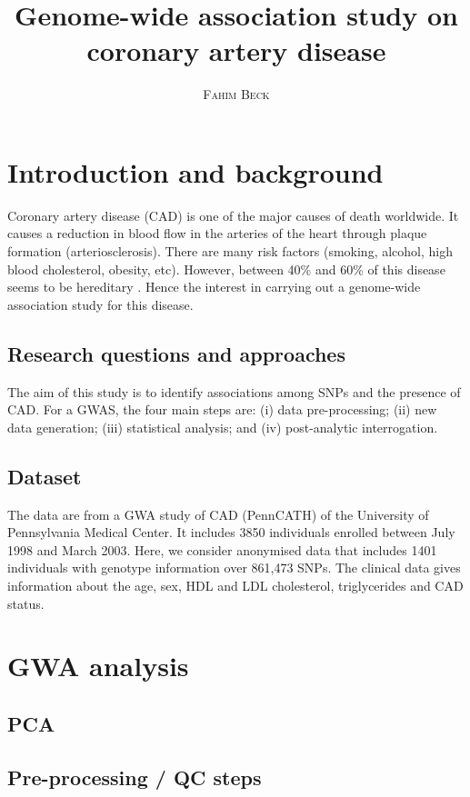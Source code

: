 \documentclass[a4paper, 12pt]{article}
\title{Genome-wide association study on coronary artery disease \vspace{0.3cm}} %
\author{\smallskip
\large \textsc{Fahim Beck}}
\date{\vspace{-1.3cm}}
\begin{document}
\maketitle

\section{Introduction and background}

Coronary artery disease (CAD) is one of the major causes of death worldwide. It causes a reduction in blood flow in the arteries of the heart through plaque formation (arteriosclerosis). There are many risk factors (smoking, alcohol, high blood cholesterol, obesity, etc). However, between 40\% and 60\% of this disease seems to be hereditary \citep{heredity}. Hence the interest in carrying out a genome-wide association study for this disease.  

\subsection*{Research questions and approaches}

The aim of this study is to identify associations among SNPs and the presence of CAD. For a GWAS, the four main steps are: (i) data pre-processing; (ii) new data generation; (iii) statistical analysis; and (iv) post-analytic interrogation. 

\subsection*{Dataset}

The data are from a GWA study of CAD (PennCATH) of the University of Pennsylvania Medical Center. It includes 3850 individuals enrolled between July 1998 and March 2003. Here, we consider anonymised data that includes 1401 individuals with genotype information over 861,473 SNPs. The clinical data gives information about the age, sex, HDL and LDL cholesterol, triglycerides and CAD status. 

\section{GWA analysis}

\subsection{PCA}

\subsection{Pre-processing / QC steps}
\end{document}
